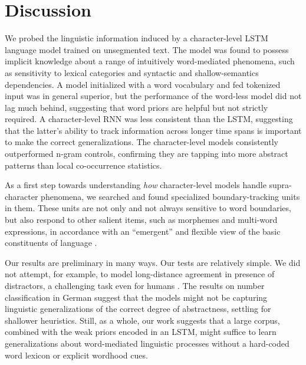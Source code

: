 \section{Discussion}
\label{sec:discussion}

We probed the linguistic information induced by a character-level LSTM
language model trained on unsegmented text. The model was found to
possess implicit knowledge about a range of intuitively word-mediated
phenomena, such as sensitivity to lexical categories and syntactic and
shallow-semantics dependencies. A model initialized with a word
vocabulary and fed tokenized input was in general superior, but the
performance of the word-less model did not lag much behind, suggesting
that word priors are helpful but not strictly required. A
character-level RNN was less consistent than the LSTM, suggesting that
the latter's ability to track information across longer time spans is
important to make the correct generalizations. The character-level
models consistently outperformed n-gram controls, confirming they are
tapping into more abstract patterns than local co-occurrence
statistics.

As a first step towards understanding \emph{how} character-level
models handle supra-character phenomena, we searched and found
specialized boundary-tracking units in them. These units are not only
and not always sensitive to word boundaries, but also respond to other
salient items, such as morphemes and multi-word expressions, in
accordance with an ``emergent'' and flexible view of the basic
constituents of language \cite{Schiering:etal:2010}.

Our results are preliminary in many ways. Our tests are relatively
simple. We did not attempt, for example, to model long-distance
agreement in presence of distractors, a challenging task even for
humans \citep{Gulordava:etal:2018}. The results on number
classification in German suggest that the models might not be
capturing linguistic generalizations of the correct degree of
abstractness, settling for shallower heuristics. Still, as a whole,
our work suggests that a large corpus, combined with the weak priors
encoded in an LSTM, might suffice to learn generalizations about
word-mediated linguistic processes without a hard-coded word lexicon
or explicit wordhood cues.

